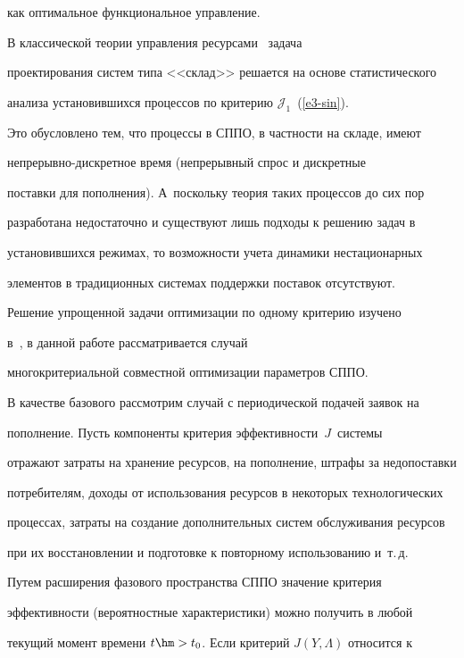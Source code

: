 как оптимальное функциональное управление.



     В классической теории управления ресурсами~\cite{22-sin} задача

проектирования сис\-тем типа <<склад>> решается на основе статистического

анализа установившихся процессов по критерию $\mathcal{J}_1$~(\ref{e3-sin}).

Это обусловлено тем, что процессы в СППО, в частности на складе, имеют

     не\-пре\-рыв\-но-дис\-крет\-ное время (непрерывный спрос и дискретные

поставки для пополнения). А~поскольку теория таких процессов до сих пор

разработана недостаточно и существуют лишь подходы к решению задач в

установившихся режимах, то возможности учета динамики нестационарных

элементов в традиционных сис\-те\-мах поддержки поставок отсутствуют.



     Решение упрощенной задачи оптимизации по одному критерию изучено

в~\cite{10-sin, 11-sin}, в данной работе рассматривается случай

многокритериальной совместной оптимизации параметров СППО.



     В качестве базового рассмотрим случай с периодической подачей заявок на

пополнение. Пусть компоненты критерия эффективности~${J}$~сис\-те\-мы

отражают затраты на хранение ресурсов, на пополнение, штрафы за недопоставки

потребителям, доходы от использования ресурсов в некоторых технологических

процессах, затраты на создание дополнительных систем обслуживания ресурсов

при их восстановлении и подготовке к повторному использованию и~т.\,д.



     Путем расширения фазового пространства СППО значение критерия

эффективности (вероятностные характеристики) можно получить в любой

текущий момент времени $t\hm> t_0$. Если критерий $J(Y,\Lambda)$ относится к

